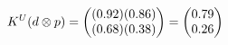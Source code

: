 \documentclass[preview]{standalone}
\begin{document}
\begin{align*}
\special{dvisvgm:raw <g id='unique000'>}K^U(d \otimes p) = \begin{pmatrix} (0.92)(0.86) \\ (0.68)(0.38) \end{pmatrix} = \begin{pmatrix} 0.79 \\ 0.26 \end{pmatrix}\special{dvisvgm:raw </g>}
\end{align*}
\end{document}
